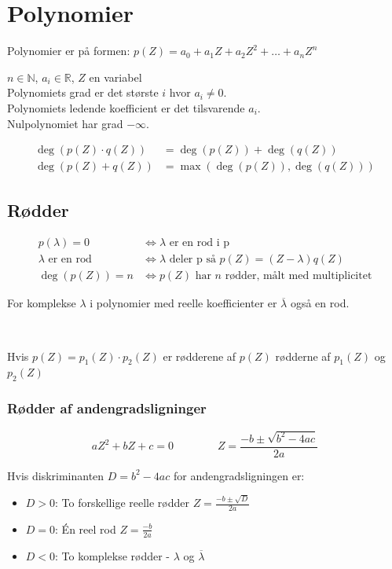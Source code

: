 \section{Polynomier}
Polynomier er på formen: \hfill
\(
    p(Z) = a_0 + a_1 Z + a_2 Z^2 + \dots + a_n Z^n
\)

$n \in \mathbb{N}$, $a_i \in \mathbb{R}$, $Z$ en variabel \\

Polynomiets grad er det største $i$ hvor $a_i \neq 0$. \\
Polynomiets ledende koefficient er det tilsvarende $a_i$. \\

Nulpolynomiet har grad $-\infty$.

\begin{align*}
    \deg(p(Z) \cdot q(Z)) &= \deg(p(Z)) + \deg(q(Z)) \\
    \deg(p(Z) + q(Z)) &= \max( \deg(p(Z)), \deg(q(Z)) )
\end{align*}

\subsection{Rødder}

\begin{align*}
    p(\lambda) = 0 &\iff \lambda \text{ er en rod i p} \\
    \lambda \text{ er en rod} &\iff \lambda \text{ deler p så } p(Z) = (Z - \lambda) q(Z) \\
    \deg(p(Z)) = n &\iff p(Z) \text{ har } n \text{ rødder, målt med multiplicitet}
\end{align*}

For komplekse $\lambda$ i polynomier med reelle koefficienter er $\overline{\lambda}$ også en rod.


\

Hvis $p(Z) = p_1(Z) \cdot p_2(Z)$ er rødderene af $p(Z)$ rødderne af $p_1(Z)$ og $p_2(Z)$



\subsubsection{Rødder af andengradsligninger}
\[
aZ^2 + bZ + c = 0 \hspace{4em} Z = \frac{-b \pm \sqrt{b^2 - 4ac}}{2a}
\]

Hvis diskriminanten $D = b^2 - 4ac$ for andengradsligningen er:
\begin{itemize}
    \item $D > 0$: To forskellige reelle rødder 
    \(
        Z = \frac{-b \pm \sqrt{D}}{2a}
    \)
    \item $D = 0$: Én reel rod
    \(
        Z = \frac{-b}{2a}
    \)
    \item $D < 0$: To komplekse rødder - $\lambda$ og $\overline{\lambda}$
\end{itemize}

